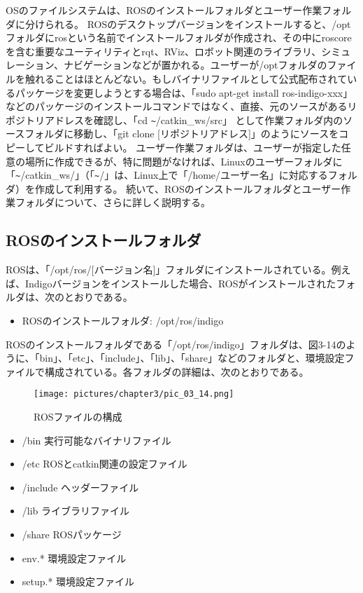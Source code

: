 OSのファイルシステムは、ROSのインストールフォルダとユーザー作業フォルダに分けられる。
ROSのデスクトップバージョンをインストールすると、/optフォルダにrosという名前でインストールフォルダが作成され、その中にroscoreを含む重要なユーティリティとrqt、RViz、ロボット関連のライブラリ、シミュレーション、ナビゲーションなどが置かれる。ユーザーが/optフォルダのファイルを触れることはほとんどない。もしバイナリファイルとして公式配布されているパッケージを変更しようとする場合は、「sudo apt-get install ros-indigo-xxx」などのパッケージのインストールコマンドではなく、直接、元のソースがあるリポジトリアドレスを確認し、「cd \verb|~|/catkin\_ws/src」 として作業フォルダ内のソースフォルダに移動し、「git clone [リポジトリアドレス]」のようにソースをコピーしてビルドすればよい。
ユーザー作業フォルダは、ユーザーが指定した任意の場所に作成できるが、特に問題がなければ、Linuxのユーザーフォルダに「\verb|~|/catkin\_ws/」（「\verb|~|/」は、Linux上で「/home/ユーザー名」に対応するフォルダ）を作成して利用する。
続いて、ROSのインストールフォルダとユーザー作業フォルダについて、さらに詳しく説明する。

\subsection{ROSのインストールフォルダ}

ROSは、「/opt/ros/[バージョン名]」フォルダにインストールされている。例えば、Indigoバージョンをインストールした場合、ROSがインストールされたフォルダは、次のとおりである。

\vspace{\baselineskip}
\begin{itemize}
\item ROSのインストールフォルダ: /opt/ros/indigo
\end{itemize}
\vspace{\baselineskip}

ROSのインストールフォルダである「/opt/ros/indigo」フォルダは、図3-14のように、「bin」、「etc」、「include」、「lib」、「share」などのフォルダと、環境設定ファイルで構成されている。各フォルダの詳細は、次のとおりである。

\begin{figure}[h]
  \centering
  \texttt{[image: pictures/chapter3/pic\_03\_14.png]}
  \caption{ROSファイルの構成}
\end{figure}

\vspace{\baselineskip}
\begin{itemize}
\item /bin    実行可能なバイナリファイル
\item /etc    ROSとcatkin関連の設定ファイル
\item /include  ヘッダーファイル
\item /lib    ライブラリファイル
\item /share  ROSパッケージ
\item env.*   環境設定ファイル
\item setup.* 環境設定ファイル
\end{itemize}
\vspace{\baselineskip}

